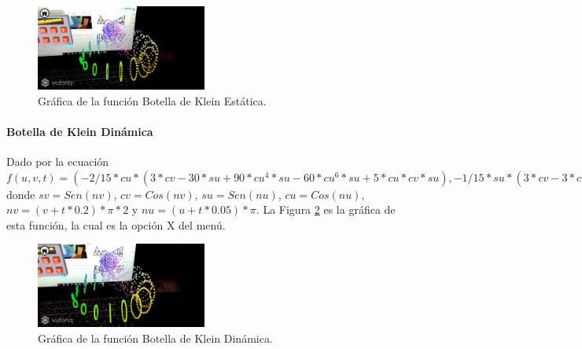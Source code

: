 \begin{figure}[hbt!]
\centering
\includegraphics[width=0.5\textwidth]{figuras/graficas/klein_estatico.png}
\caption{\label{fig:graf_klein_estatico}Gráfica de la función Botella de Klein Estática.}
\end{figure}
\FloatBarrier

\paragraph{Botella de Klein Dinámica}
Dado por la ecuación $f(u,v,t)=(-2/15 * cu * (3 * cv - 30 * su + 90 * cu^4 * su - 60 * cu^6 * su + 5 * cu * cv * su), -1/15 * su * (3 * cv - 3 * cu^2 * cv - 48 * cu^4 * cv + 48 * cu^6 * cv - 60 * su + 5 * cu * cv * su - 5 * cu^3 * cv * su - 80 * cu^5 * cv * sv + 80 * cu^7 * cv * su) -2, 2/15 * (3 + 5 * cu * su) * sv)$ donde $sv = Sen(nv)$, $cv = Cos(nv)$, $su = Sen(nu)$, $cu = Cos(nu)$, $nv = (v+ t * 0.2) * \pi * 2$ y $nu = (u+ t * 0.05) * \pi$. La Figura \ref{fig:graf_klein_dinamico} es la gráfica de esta función, la cual es la opción X del menú.

\begin{figure}[hbt!]
\centering
\includegraphics[width=0.5\textwidth]{figuras/graficas/klein_dinamico.png}
\caption{\label{fig:graf_klein_dinamico}Gráfica de la función Botella de Klein Dinámica.}
\end{figure}
\FloatBarrier



